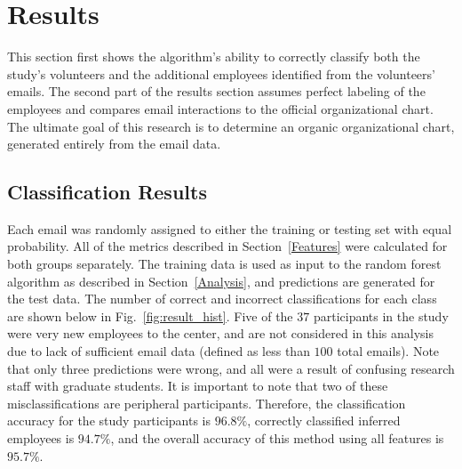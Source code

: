 \documentclass[10pt,twocolumn,conference]{IEEEtran}
\begin{document}
\section{Results} \label{Results}
This section first shows the algorithm's ability to correctly classify both the study's volunteers and the additional employees identified from the volunteers' emails.
The second part of the results section assumes perfect labeling of the employees and compares email interactions to the official organizational chart.
The ultimate goal of this research is to determine an organic organizational chart, generated entirely from the email data.

\subsection{Classification Results}\label{ssec:class_results}
Each email was randomly assigned to either the training or testing set with equal probability.
All of the metrics described in Section~\ref{Features} were calculated for both groups separately.
The training data is used as input to the random forest algorithm as described in Section~\ref{Analysis}, and predictions are generated for the test data.
The number of correct and incorrect classifications for each class are shown below in Fig.~\ref{fig:result_hist}.
Five of the $37$ participants in the study were very new employees to the center, and are not considered in this analysis due to lack of sufficient email data (defined as less than $100$ total emails).
Note that only three predictions were wrong, and all were a result of confusing research staff with graduate students.
It is important to note that two of these misclassifications are peripheral participants.
Therefore, the classification accuracy for the study participants is $96.8\%$, correctly classified inferred employees is $94.7\%$, and the overall accuracy of this method using all features is $95.7\%$.
\end{document}
